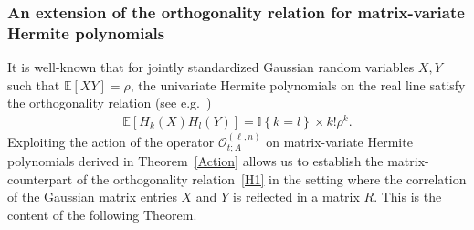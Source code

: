\documentclass[10pt]{amsart}
\theoremstyle{definition}\newtheorem{defi}[theo]{Definition}\newtheorem{rema}[theo]{Remark}\newtheorem{exam}[theo]{Example}\newtheorem{exem}[theo]{Example}\newtheorem{nota}[theo]{Notation}
\newcommand{\clO}{\mathcal{O}}
\newcommand{\E}[1]{\mathbb{E}\left[#1\right]}
\newcommand{\ind}[1]{\mathbb{I}
\left\{#1\right\}}
\begin{document}
\subsubsection{An extension of the orthogonality relation for matrix-variate Hermite polynomials} 

It is well-known that for jointly standardized Gaussian random variables $X,Y$ such that $\E{XY}=\rho$, the univariate Hermite polynomials on the real line satisfy the orthogonality relation (see e.g.~\cite[Proposition~2.2.1]{NP12})
\begin{gather}\label{H1}
\E{H_k(X)H_l(Y)}=\ind{k=l} \times k! \rho^{k}.
\end{gather}
Exploiting the action of the operator $\clO_{t;A}^{(\ell,n)}$ on matrix-variate Hermite polynomials derived in Theorem~\ref{Action} allows us to establish the matrix-counterpart of the orthogonality relation~\eqref{H1} in the setting where the correlation of the Gaussian matrix entries $X$ and $Y$ is reflected in a matrix $R$. This is the content of the following Theorem.
\end{document}
